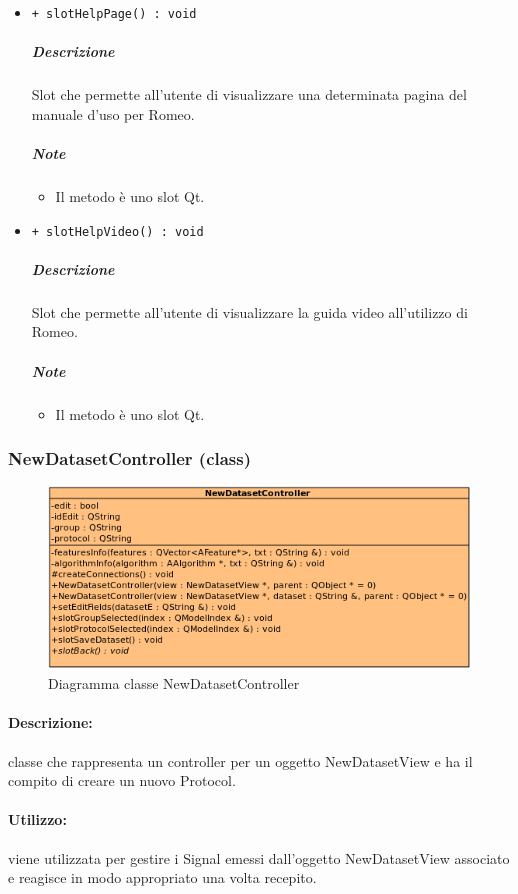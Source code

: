 \begin{itemize}
\begin{itemize}
			\end{itemize}
			\item \color{blue} \verb!+ slotHelpPage() : void!
			\color{black}
			\subparagraph{Descrizione} Slot\g{} che permette all'utente di visualizzare una determinata pagina del manuale d'uso per Romeo.
			\subparagraph{Note}
			\begin{itemize}
				\item Il metodo è uno slot\g{} Qt\g{}.
			\end{itemize}
			\item \color{blue} \verb!+ slotHelpVideo() : void!
			\color{black}
			\subparagraph{Descrizione} Slot\g{} che permette all'utente di visualizzare la guida video all'utilizzo di Romeo.
			\subparagraph{Note}
			\begin{itemize}
				\item Il metodo è uno slot\g{} Qt\g{}.
			\end{itemize}
		\end{itemize}
	\subsubsection{NewDatasetController (class)}
	\begin{figure}[!h]
		\centering
		\includegraphics[scale=2.75]{./Content/Immagini/controller/NewDatasetController.png}
		\caption{Diagramma classe NewDatasetController}
	\end{figure}
	\paragraph{Descrizione:} classe che rappresenta un controller per un oggetto NewDatasetView e ha il compito di creare un nuovo Protocol\g{}.
	\paragraph{Utilizzo:} viene utilizzata per gestire i Signal\g{} emessi dall'oggetto NewDatasetView associato e reagisce in modo appropriato una volta recepito.
